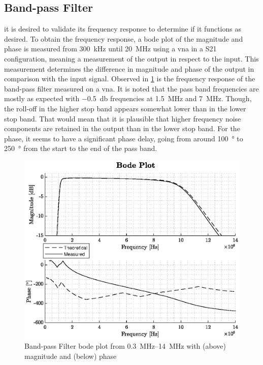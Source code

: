 
\subsection{Band-pass Filter}
it is desired to validate its frequency response to determine if it functions as desired. To obtain the frequency response, a bode plot of the magnitude and phase is measured from \qty{300}{\kilo\hertz} until \qty{20}{\mega\hertz} using a \gls{vna} in a S21 configuration, meaning a measurement of the output in respect to the input. This measurement determines the difference in magnitude and phase of the output in comparison with the input signal. Observed in \cref{fig:4_bpf_measurement} is the frequency response of the band-pass filter measured on a \gls{vna}. It is noted that the pass band frequencies are mostly as expected with \qty{-0.5}{\decibel} frequencies at \qty{1.5}{\mega\hertz} and \qty{7}{\mega\hertz}. Though, the roll-off in the higher stop band appears somewhat lower than in the lower stop band. That would mean that it is plausible that higher frequency noise components are retained in the output than in the lower stop band. For the phase, it seems to have a significant phase delay, going from around \qty{100}{\degree} to \qty{250}{\degree} from the start to the end of the pass band.
\begin{figure}[htbp]
	\centering
	\includegraphics[width=.8\textwidth]{Figures/4_bpf_measurement_vna.eps}
	\caption[Band-pass filter bode plot]{Band-pass Filter bode plot from \qtyrange{0.3}{14}{\mega\hertz} with (above) magnitude and (below) phase}
	\label{fig:4_bpf_measurement}
\end{figure}

